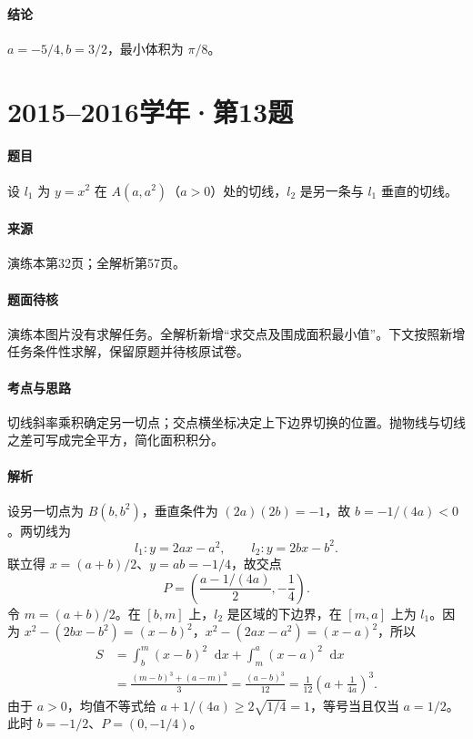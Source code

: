\documentclass[UTF8,fontset=fandol,12pt,oneside,openany]{ctexrep}
\newcommand{\dd}{\mathop{}\!\mathrm d}
\theoremstyle{definition}
\begin{document}
\paragraph{结论}$a=-5/4,b=3/2$，最小体积为 $\pi/8$。

\par\addvspace{18pt}\noindent\begin{minipage}{\linewidth}
\section{2015--2016学年·第13题}
\paragraph{题目}设 $l_1$ 为 $y=x^2$ 在 $A(a,a^2)$（$a>0$）处的切线，$l_2$ 是另一条与 $l_1$ 垂直的切线。
\paragraph{来源}演练本第32页；全解析第57页。
\paragraph{题面待核}演练本图片没有求解任务。全解析新增“求交点及围成面积最小值”。下文按照新增任务条件性求解，保留原题并待核原试卷。
\end{minipage}\par
\paragraph{考点与思路}切线斜率乘积确定另一切点；交点横坐标决定上下边界切换的位置。抛物线与切线之差可写成完全平方，简化面积积分。
\paragraph{解析}设另一切点为 $B(b,b^2)$，垂直条件为 $(2a)(2b)=-1$，故 $b=-1/(4a)<0$。两切线为
\[
 l_1:y=2ax-a^2,\qquad l_2:y=2bx-b^2.
\]
联立得 $x=(a+b)/2$、$y=ab=-1/4$，故交点
\[
 P=\left(\frac{a-1/(4a)}2,-\frac14\right).
\]
令 $m=(a+b)/2$。在 $[b,m]$ 上，$l_2$ 是区域的下边界，在 $[m,a]$ 上为 $l_1$。因为
$x^2-(2bx-b^2)=(x-b)^2$，$x^2-(2ax-a^2)=(x-a)^2$，所以
\begin{align*}
 S&=\int_b^m(x-b)^2\dd x+\int_m^a(x-a)^2\dd x\\
 &=\frac{(m-b)^3+(a-m)^3}{3}
 =\frac{(a-b)^3}{12}
 =\frac1{12}\left(a+\frac1{4a}\right)^3.
\end{align*}
由于 $a>0$，均值不等式给 $a+1/(4a)\ge2\sqrt{1/4}=1$，等号当且仅当 $a=1/2$。此时 $b=-1/2$、$P=(0,-1/4)$。
\end{document}

